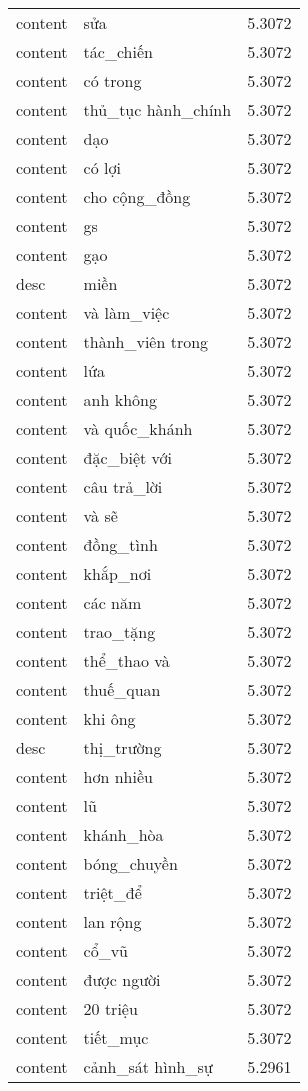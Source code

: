 \documentclass{article}
\begin{document}
\begin{tabular}{lll}
content & sửa & 5.3072\\
content & tác\_chiến & 5.3072\\
content & có trong & 5.3072\\
content & thủ\_tục hành\_chính & 5.3072\\
content & dạo & 5.3072\\
content & có lợi & 5.3072\\
content & cho cộng\_đồng & 5.3072\\
content & gs & 5.3072\\
content & gạo & 5.3072\\
desc & miền & 5.3072\\
content & và làm\_việc & 5.3072\\
content & thành\_viên trong & 5.3072\\
content & lứa & 5.3072\\
content & anh không & 5.3072\\
content & và quốc\_khánh & 5.3072\\
content & đặc\_biệt với & 5.3072\\
content & câu trả\_lời & 5.3072\\
content & và sẽ & 5.3072\\
content & đồng\_tình & 5.3072\\
content & khắp\_nơi & 5.3072\\
content & các năm & 5.3072\\
content & trao\_tặng & 5.3072\\
content & thể\_thao và & 5.3072\\
content & thuế\_quan & 5.3072\\
content & khi ông & 5.3072\\
desc & thị\_trường & 5.3072\\
content & hơn nhiều & 5.3072\\
content & lũ & 5.3072\\
content & khánh\_hòa & 5.3072\\
content & bóng\_chuyền & 5.3072\\
content & triệt\_để & 5.3072\\
content & lan rộng & 5.3072\\
content & cổ\_vũ & 5.3072\\
content & được người & 5.3072\\
content & 20 triệu & 5.3072\\
content & tiết\_mục & 5.3072\\
content & cảnh\_sát hình\_sự & 5.2961\\

\end{tabular}
\end{document}
